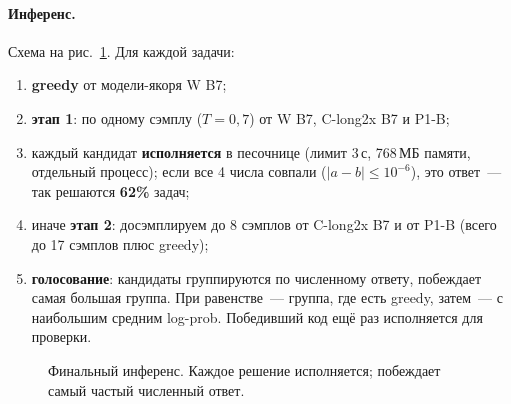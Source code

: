 \documentclass[11pt,a4paper]{article}
\begin{document}
\paragraph{Инференс.} Схема на рис.~\ref{fig:final}. Для каждой задачи:
\begin{enumerate}
  \item \textbf{greedy} от модели-якоря W B7;
  \item \textbf{этап 1}: по одному сэмплу ($T=0{,}7$) от W B7, C-long2x B7 и P1-B;
  \item каждый кандидат \textbf{исполняется} в песочнице (лимит 3\,с, 768\,МБ памяти, отдельный процесс); если все 4 числа совпали ($|a-b|\le10^{-6}$), это ответ~--- так решаются \textbf{62\%} задач;
  \item иначе \textbf{этап 2}: досэмплируем до 8 сэмплов от C-long2x B7 и от P1-B (всего до 17 сэмплов плюс greedy);
  \item \textbf{голосование}: кандидаты группируются по численному ответу, побеждает самая большая группа. При равенстве~--- группа, где есть greedy, затем~--- с наибольшим средним log-prob. Победивший код ещё раз исполняется для проверки.
\end{enumerate}

\begin{figure}[h]
\centering
{}
\caption{Финальный инференс. Каждое решение исполняется; побеждает самый частый численный ответ.}
\label{fig:final}
\end{figure}
\end{document}
